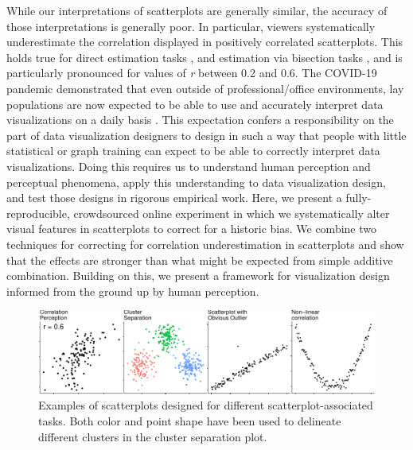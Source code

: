 \documentclass[manuscript, review, anonymous, screen]{acmart}
\begin{document}
While our interpretations of scatterplots are generally similar, the
accuracy of those interpretations is generally poor. In particular,
viewers systematically underestimate the correlation displayed in
positively correlated scatterplots. This holds true for direct
estimation tasks
\citep{strahan_1978, bobko_1979, cleveland_1982, lane_1985, lauer_1989, collyer_1990, meyer_1992},
and estimation via bisection tasks \citep{rensink_2017}, and is
particularly pronounced for values of \emph{r} between 0.2 and 0.6. The
COVID-19 pandemic demonstrated that even outside of professional/office
environments, lay populations are now expected to be able to use and
accurately interpret data visualizations on a daily basis
\citep{bbc_2022}. This expectation confers a responsibility on the part
of data visualization designers to design in such a way that people with
little statistical or graph training can expect to be able to correctly
interpret data visualizations. Doing this requires us to understand
human perception and perceptual phenomena, apply this understanding to
data visualization design, and test those designs in rigorous empirical
work. Here, we present a fully-reproducible, crowdsourced online
experiment in which we systematically alter visual features in
scatterplots to correct for a historic bias. We combine two techniques
for correcting for correlation underestimation in scatterplots and show
that the effects are stronger than what might be expected from simple
additive combination. Building on this, we present a framework for
visualization design informed from the ground up by human perception.

\begin{figure}

{\centering \includegraphics[width=1\textwidth,height=\textheight]{size_and_opacity_files/figure-pdf/fig-tasks-1.pdf}

}

\caption{\label{fig-tasks}Examples of scatterplots designed for
different scatterplot-associated tasks. Both color and point shape have
been used to delineate different clusters in the cluster separation
plot.}

\end{figure}
\end{document}
